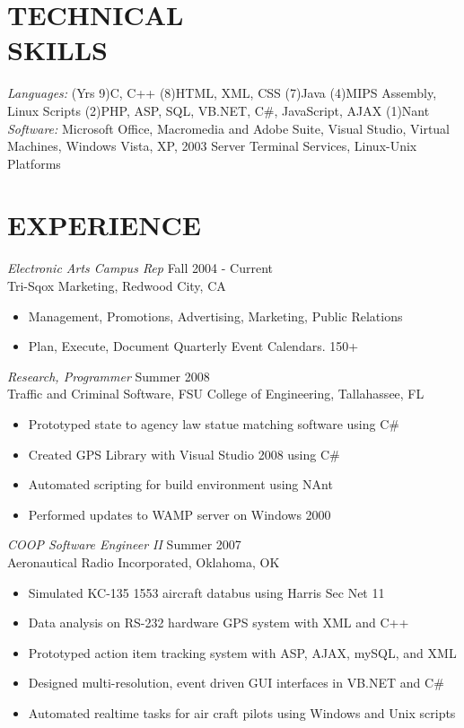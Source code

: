 \documentclass[margin]{res}
\begin{document}
\begin{resume}
\section{TECHNICAL \\ SKILLS} {\sl Languages:}
(Yrs 9)C, C++
(8)HTML, XML, CSS
(7)Java
(4)MIPS Assembly, Linux Scripts
(2)PHP, ASP, SQL, VB.NET, C\#, JavaScript, AJAX
(1)Nant \\
{\sl Software:}
Microsoft Office, Macromedia and Adobe Suite,
Visual Studio,
Virtual Machines,
Windows Vista, XP, 2003 Server Terminal Services,
Linux-Unix Platforms
 
\section{EXPERIENCE} {\sl Electronic Arts Campus Rep} \hfill Fall 2004 - Current\\
Tri-Sqox Marketing, Redwood City, CA
\begin{itemize}  \itemsep -2pt %
\item Management, Promotions, Advertising, Marketing, Public Relations
\item Plan, Execute, Document Quarterly Event Calendars. 150+
\end{itemize}
 
{\sl Research, Programmer} \hfill            Summer 2008 \\
Traffic and Criminal Software, FSU College of Engineering, Tallahassee, FL
\begin{itemize}  \itemsep -2pt %
\item Prototyped state to agency law statue matching software using C\#
\item Created GPS Library with Visual Studio 2008 using C\#
\item Automated scripting for build environment using NAnt
\item Performed updates to WAMP server on Windows 2000
\end{itemize} 

{\sl COOP Software Engineer II} \hfill        Summer 2007 \\
Aeronautical Radio Incorporated, Oklahoma, OK
\begin{itemize} \itemsep -2pt %
\item Simulated KC-135 1553 aircraft databus using Harris Sec Net 11
\item Data analysis on RS-232 hardware GPS system with XML and C++
\item Prototyped action item tracking system with ASP, AJAX, mySQL, and XML
\item Designed multi-resolution, event driven GUI interfaces in VB.NET and C\#
\item Automated realtime tasks for air craft pilots using Windows and Unix scripts
\end{itemize} 
 

\end{resume}
\end{document}
